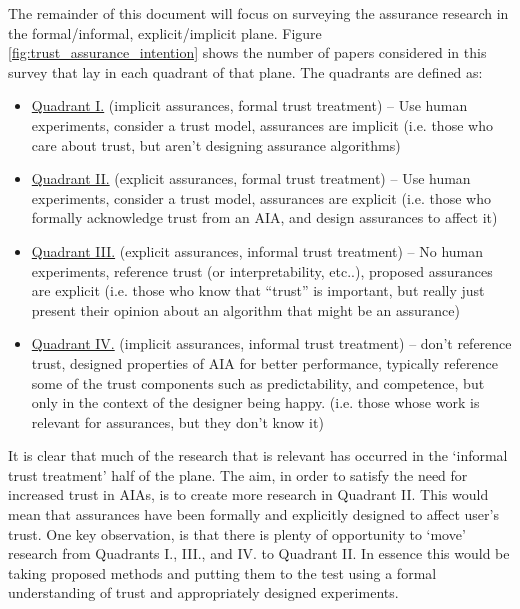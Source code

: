 The remainder of this document will focus on surveying the assurance research in the formal/informal, explicit/implicit plane. Figure \ref{fig:trust_assurance_intention} shows the number of papers considered in this survey that lay in each quadrant of that plane. The quadrants are defined as:

\begin{itemize}
    \item \hyperref[sec:q1]{Quadrant I.} (implicit assurances, formal trust treatment) -- Use human experiments, consider a trust model, assurances are implicit (i.e. those who care about trust, but aren't designing assurance algorithms)
    \item \hyperref[sec:q2]{Quadrant II.} (explicit assurances, formal trust treatment) -- Use human experiments, consider a trust model, assurances are explicit (i.e. those who formally acknowledge trust from an AIA, and design assurances to affect it)
    \item \hyperref[sec:q3]{Quadrant III.} (explicit assurances, informal trust treatment) -- No human experiments, reference trust (or interpretability, etc..), proposed assurances are explicit (i.e. those who know that ``trust'' is important, but really just present their opinion about an algorithm that might be an assurance)
    \item \hyperref[sec:q4]{Quadrant IV.} (implicit assurances, informal trust treatment) -- don't reference trust, designed properties of AIA for better performance, typically reference some of the trust components such as predictability, and competence, but only in the context of the designer being happy. (i.e. those whose work is relevant for assurances, but they don't know it)
\end{itemize}

It is clear that much of the research that is relevant has occurred in the `informal trust treatment' half of the plane. The aim, in order to satisfy the need for increased trust in AIAs, is to create more research in Quadrant II. This would mean that assurances have been formally and explicitly designed to affect user's trust. One key observation, is that there is plenty of opportunity to `move' research from Quadrants I., III., and IV. to Quadrant II. In essence this would be taking proposed methods and putting them to the test using a formal understanding of trust and appropriately designed experiments.





